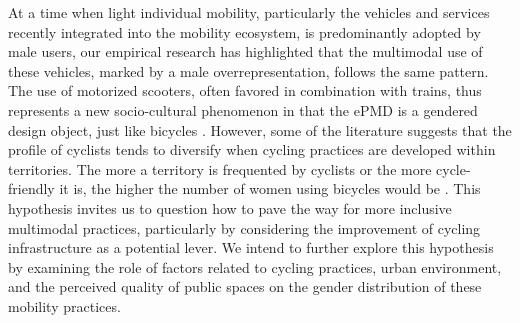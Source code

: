 \begin{refsegment}
At a time when light individual mobility, particularly the vehicles and services recently integrated into the mobility ecosystem, is predominantly adopted by male users, our empirical research has highlighted that the multimodal use of these vehicles, marked by a male overrepresentation, follows the same pattern. The use of motorized scooters, often favored in combination with trains, thus represents a new socio-cultural phenomenon in that the \acrshort{ePMD} is a gendered design object, just like bicycles \textcolor{blue}{\autocites[16]{clewlow_micromobility_2018}[17]{sayagh_adolescentes_2018}[2]{abord_dechatillon_velo_2021}}. However, some of the literature suggests that the profile of cyclists tends to diversify when cycling practices are developed within territories. The more a territory is frequented by cyclists or the more cycle-friendly it is, the higher the number of women using bicycles would be \textcolor{blue}{\autocite{lardellier_cadres_2021}}. This hypothesis invites us to question how to pave the way for more inclusive multimodal practices, particularly by considering the improvement of cycling infrastructure as a potential lever. We intend to further explore this hypothesis by examining the role of factors related to cycling practices, urban environment, and the perceived quality of public spaces on the gender distribution of these mobility practices. %

\newpage
{} %

\end{refsegment}
